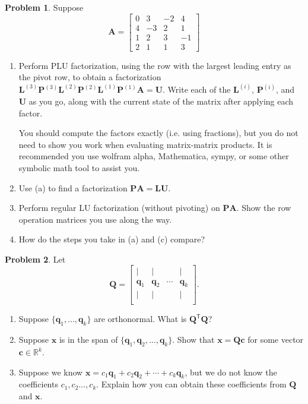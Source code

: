 \documentclass[12pt]{article}
\theoremstyle{definition}
\newtheorem{problem}{Problem}
\renewcommand{\vec}{\mathbf}
\newcommand{\T}{\mathsf{T}}
\begin{document}
\begin{problem}
Suppose
    \[
        \vec{A} 
        = 
        \begin{bmatrix}
            0 & 3 & -2 & 4 \\
            4 & -3 & 2 & 1 \\
            1 & 2 & 3 & -1 \\
            2 & 1 & 1& 3
        \end{bmatrix}
    \]

    \begin{enumerate}
        \item Perform PLU factorization, using the row with the largest leading entry as the pivot row, to obtain a factorization $\vec{L}^{(3)} \vec{P}^{(3)} \vec{L}^{(2)} \vec{P}^{(2)} \vec{L}^{(1)} \vec{P}^{(1)} \vec{A} = \vec{U}$.
        Write each of the $\vec{L}^{(i)}$, $\vec{P}^{(i)}$, and $\vec{U}$ as you go, along with the current state of the matrix after applying each factor.
            
            You should compute the factors exactly (i.e. using fractions), but you do not need to show you work when evaluating matrix-matrix products. It is recommended you use wolfram alpha, Mathematica, sympy, or some other symbolic math tool to assist you.  
        \item Use (a) to find a factorization $\vec{P}\vec{A}  = \vec{L} \vec{U}$.
        \item Perform regular LU factorization (without pivoting) on $\vec{P}\vec{A}$.
            Show the row operation matrices you use along the way.
        \item How do the steps you take in (a) and (c) compare?
    \end{enumerate}
\end{problem}


\begin{problem}
Let 
\[
\vec{Q} = \begin{bmatrix}
|&|&&| \\
\vec{q}_1 & \vec{q}_2 & \cdots & \vec{q}_k \\
|&|&&| \\
\end{bmatrix}.
\]

\begin{enumerate}
    \item Suppose $\{\vec{q}_1, \ldots, \vec{q}_k\}$ are orthonormal. What is $\vec{Q}^\T \vec{Q}$?
    \item Suppose $\vec{x}$ is in the span of $\{\vec{q}_1, \vec{q}_2, \ldots, \vec{q}_k\}$. Show that $\vec{x} = \vec{Q}\vec{c}$ for some vector $\vec{c}\in\mathbb{R}^k$.
    \item Suppose we know $\vec{x} = c_1 \vec{q}_1 + c_2 \vec{q}_2 + \cdots + c_k \vec{q}_k$, but we do not know the coefficients $c_1, c_2 \ldots, c_k$. 
       Explain how you can obtain these coefficients from $\vec{Q}$ and $\vec{x}$.
\end{enumerate}

\end{problem}
\end{document}
